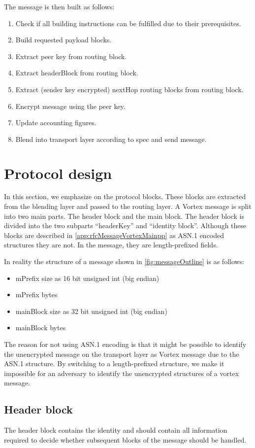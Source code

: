 The message is then built as follows:
\begin{enumerate}
	\item Check if all building instructions can be fulfilled due to their prerequisites.
	\item Build requested payload blocks.
	\item Extract peer key from routing block.
	\item Extract headerBlock from routing block.
	\item Extract (sender key encrypted) nextHop routing blocks from routing block.
	\item Encrypt message using the peer key.
	\item Update accounting figures.
	\item Blend into transport layer according to spec and send message.
\end{enumerate}

\section{Protocol design}
In this section, we emphasize on the protocol blocks. These blocks are extracted from the blending layer and passed to the routing layer. A Vortex message is split into two main parts. The header block and the main block. The header block is divided into the two subparts ``headerKey'' and ``identity block''. Although these blocks are described in \ref{app:rfcMessageVortexMainpp} as ASN.1 encoded structures they are not. In the message, they are length-prefixed fields.

In reality the structure of a message shown in \ref{fig:messageOutline} is as follows:
\begin{itemize}
	\item mPrefix size as 16 bit unsigned int (big endian)
	\item mPrefix bytes
	\item mainBlock size as 32 bit unsigned int (big endian)
	\item mainBlock bytes
\end{itemize}

The reason for not using ASN.1 encoding is that it might be possible to identify the unencrypted message on the transport layer as Vortex message due to the ASN.1 structure. By switching to a length-prefixed structure, we make it impossible for an adversary to identify the unencrypted structures of a vortex message.

\subsection{Header block}
The header block contains the identity and should contain all information required to decide whether subsequent blocks of the message should be handled.

